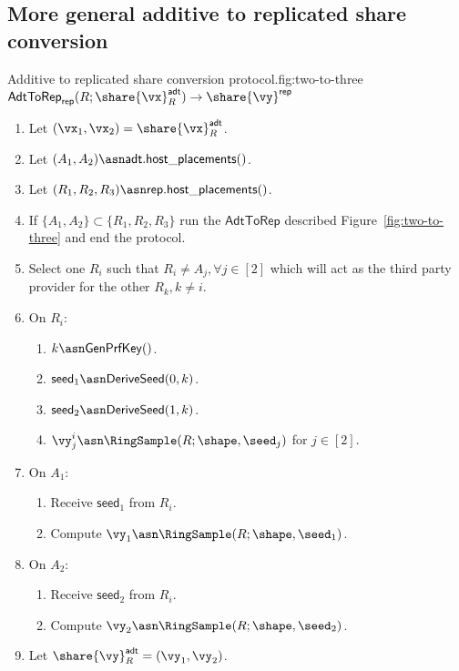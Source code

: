 \subsection{More general additive to replicated share conversion}


\begin{Boxfig}{Additive to replicated share conversion
protocol.}{fig:two-to-three}{$\mathsf{AdtToRep}_\mathsf{rep}(R;
\share{\vx}^{\mathsf{adt}}_{R}) \rightarrow \share{\vy}^\mathsf{rep}$}
\begin{enumerate}
\item Let $(\vx_1, \vx_2) = \share{\vx}^{\mathsf{adt}}_{R}$.
\item Let $(A_1, A_2) \asn \mathsf{adt}.\mathsf{host\_placements()}$.
\item Let $(R_1, R_2, R_3) \asn \mathsf{rep}.\mathsf{host\_placements()}$.
\item If $\{A_1, A_2\} \subset \{R_1, R_2, R_3\}$ run the $\mathsf{AdtToRep}$ described Figure~\ref{fig:two-to-three} and end the protocol.
\item Select one $R_i$ such that $R_i \neq A_j, \forall j \in [2]$ which will act as the third party provider for the other $R_k, k \neq i$.
\item On $R_i$:
\begin{enumerate}
    \item $k \asn \mathsf{GenPrfKey}()$.
    \item $\mathsf{seed}_1 \asn \mathsf{DeriveSeed}(0, k)$.
    \item $\mathsf{seed}_2 \asn \mathsf{DeriveSeed}(1, k)$.
    \item $\vy_j^i \asn \RingSample(R; \shape, \seed_j)$ for $j \in [2]$.
\end{enumerate}
\item On $A_1$:
\begin{enumerate}
    \item Receive $\mathsf{seed}_1$ from $R_i$.
    \item Compute $\vy_1 \asn \RingSample(R; \shape, \seed_1)$.
\end{enumerate}
\item On $A_2$:
\begin{enumerate}
    \item Receive $\mathsf{seed}_2$ from $R_i$.
    \item Compute $\vy_2 \asn \RingSample(R; \shape, \seed_2)$.
\end{enumerate}
\item Let $\share{\vy}^{\mathsf{adt}}_{R} = (\vy_1, \vy_2)$.

\end{enumerate}
\end{Boxfig}
